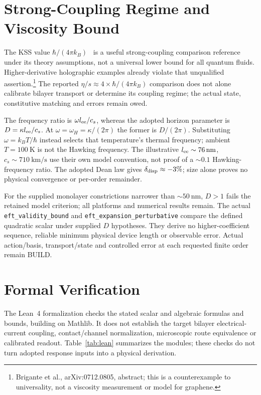 \documentclass[aps,prd,twocolumn,showpacs,superscriptaddress,nofootinbib]{revtex4-2}
\begin{document}
\section{Strong-Coupling Regime and Viscosity Bound}
\label{sec:viscosity}

The KSS value $\hbar/(4\pi k_B)$~\cite{KSS2005} is a useful
strong-coupling comparison reference under its theory assumptions,
not a universal lower bound for all quantum fluids.
Higher-derivative holographic examples already violate that
unqualified assertion.\footnote{Brigante et al.,
arXiv:0712.0805, abstract; this is a counterexample to universality,
not a viscosity measurement or model for graphene.}
The reported $\eta/s\approx4\times\hbar/(4\pi k_B)$ comparison
does not alone calibrate bilayer transport or determine its coupling
regime; the actual state, constitutive matching and errors remain owed.

The frequency ratio is $\omega l_{\rm ee}/c_s$, whereas the adopted
horizon parameter is $D=\kappa l_{\rm ee}/c_s$. At
$\omega=\omega_H=\kappa/(2\pi)$ the former is $D/(2\pi)$.
Substituting $\omega=k_BT/\hbar$ instead selects that temperature's
thermal frequency; ambient $T=\SI{100}{\kelvin}$ is not the Hawking
frequency. The illustrative $l_{\rm ee}\sim\SI{76}{\nano\meter}$,
$c_s\sim\SI{710}{\kilo\meter/\second}$ use their own model convention,
not proof of a ${\sim}0.1$ Hawking-frequency ratio. The adopted Dean law
gives $\delta_{\rm disp}\approx-3\%$; size alone proves no physical
convergence or per-order remainder.

For the supplied monolayer constrictions narrower than
${\sim}\SI{50}{\nano\meter}$, $D>1$ fails the retained model criterion;
all platforms and numerical results remain. The actual
\texttt{eft\_validity\_bound} and \texttt{eft\_expansion\_perturbative}
compare the defined quadratic scalar under supplied $D$ hypotheses.
They derive no higher-coefficient sequence, reliable minimum physical
device length or observable error. Actual action/basis, transport/state
and controlled error at each requested finite order remain BUILD.

\section{Formal Verification}
\label{sec:lean}

The Lean~4 formalization checks the stated scalar and algebraic formulas
and bounds, building on Mathlib. It does not establish the target bilayer
electrical-current coupling, contact/channel normalization, microscopic
route equivalence or calibrated readout. Table~\ref{tab:lean} summarizes
the modules; these checks do not turn adopted response inputs into a
physical derivation.
\end{document}

